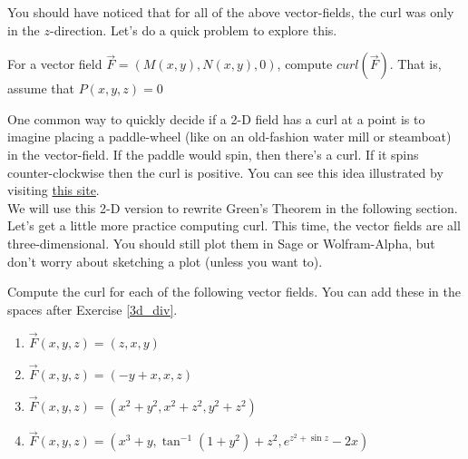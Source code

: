 You should have noticed that for all of the above vector-fields, the curl was only in the $z$-direction. Let's do a quick problem to explore this.

\begin{problem}\label{show2dcurl}
For a vector field $\vec{F}= ( M(x,y), N(x,y), 0 )$, compute $curl( \vec{F})$. That is, assume that $P(x,y,z)=0$
\end{problem}

One common way to quickly decide if a 2-D field has a curl at a point is to imagine placing a paddle-wheel (like on an old-fashion water mill or steamboat) in the vector-field. If the paddle would spin, then there's a curl. If it spins counter-clockwise then the curl is positive. You can see this idea illustrated by visiting \href{http://www.math.harvard.edu/~knill/pitf/2dcurldiv.html}{this site}.\\

We will use this 2-D version to rewrite Green's Theorem in the following section. Let's get a little more practice computing curl. This time, the vector fields are all three-dimensional. You should still plot them in Sage or Wolfram-Alpha, but don't worry about sketching a plot (unless you want to).
\begin{problem}\label{3dcurl}
Compute the curl for each of the following vector fields. You can add these in the spaces after Exercise \ref{3d_div}.
\begin{enumerate}
 \item $\vec F(x,y,z) = \left(z,x,y \right)$
 \item $\vec F(x,y,z) = \left(-y+x,x,z \right)$
 \item $\vec F(x,y,z) = \left(x^2+y^2,x^2+z^2,y^2+z^2 \right)$
 \item $\vec F(x,y,z) = \left(x^3+y,\tan^{-1}(1+y^2) + z^2,e^{z^2+\sin z} -2x\right)$
\end{enumerate}
\end{problem}




